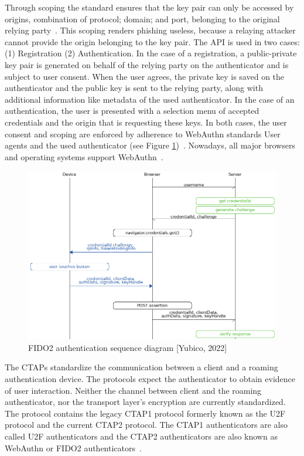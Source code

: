 \documentclass[runningheads]{llncs}
\begin{document}
Through scoping the standard ensures that the key pair can only be accessed by origins, combination of protocol; domain; and port, belonging to the original relying party~\cite{274610}. This scoping renders phishing useless, because a relaying attacker cannot provide the origin belonging to the key pair. The API is used in two cases: (1) Registration (2) Authentication. In the case of a registration, a public-private key pair is generated  on behalf of the relying party on the authenticator and is subject to user consent. When the user agrees, the private key is saved on the authenticator and the public key is sent to the relying party, along with additional information like metadata of the used authenticator. In the case of an authentication, the user is presented with a selection menu of accepted credentials and the origin that is requesting these keys. In both cases, the user consent and scoping are enforced by adherence to WebAuthn standards User agents and the used authenticator (see Figure \ref{figure_one})~\cite{000002}. Nowadays, all major browsers and operating systems support WebAuthn~\cite{000001}.

\begin{figure}[ht]
  \centering
  \includegraphics[width=\textwidth]{references/fido_flow_by_yubico.png}
  \caption{FIDO2 authentication sequence diagram [Yubico, 2022]}
  \label{figure_one}
\end{figure}

The CTAPs standardize the communication between a client and a roaming authentication device. The protocols expect the authenticator to obtain evidence of user interaction. Neither the channel between client and the roaming authenticator, nor the transport layer's encryption are currently standardized. The protocol contains the legacy CTAP1 protocol formerly known as the U2F protocol and the current CTAP2 protocol. The CTAP1 authenticators are also called U2F authenticators and the CTAP2 authenticators are also known as WebAuthn or FIDO2 authenticators~\cite{000003,274547,9099190}.
\end{document}
